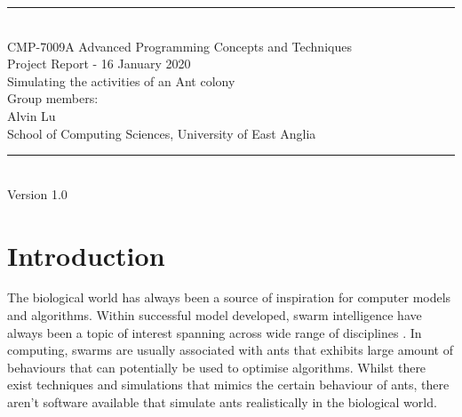 \documentclass[a4paper, oneside, 11pt]{report}
\begin{document}
\begin{titlepage}
\begin{center}
\rule{12cm}{1mm} \\
\vspace{1cm}
{\large  CMP-7009A Advanced Programming Concepts and Techniques}
\vspace{7.5cm}
\\{\Large Project Report - 16 January 2020}
\vspace{1.5cm}
\\{\LARGE Simulating the activities of an Ant colony}
\vspace{1.0cm}
\\{\Large Group members: \\ Alvin Lu}
\vspace{10.0cm}
\\{\large School of Computing Sciences, University of East Anglia}
\\ \rule{12cm}{0.5mm}
\\ \hspace{8.5cm} {\large Version 1.0}
\end{center}
\end{titlepage}


\setcounter{page}{1}


\begin{abstract}
An abstract is a brief summary (maximum 250 words) of your entire project. It should cover your objectives, your methodology used, how you implemented the methodology for your specific results and what your final results are, your final outcome or deliverable and conclusion. You do not cover literature reviews or background in an abstract nor should you use abbreviations or acronyms. In the remainder of the report the chapter titles are suggestions and can be changed (or you can add more chapters if you wish to do so). This template is designed to help you write a clear report but you are welcome to modify it (at your peril ...). Finally, a guideline in size is approximately 3,500 words (not including abstract, captions and references) but no real limit on figures, tables, etc.
\end{abstract}

\chapter{Introduction}
\label{chap:intro}

The biological world has always been a source of inspiration for computer models and algorithms. Within successful model developed, swarm intelligence have always been a topic of interest spanning across wide range of disciplines \citep{Swarm_Intro}. In computing, swarms are usually associated with ants that exhibits large amount of behaviours that can potentially be used to optimise algorithms. Whilst there exist techniques and simulations \citep{Ant_Simulator} \citep{Ant_Simulator_Revisited} \citep{Ant_Simulator_Intro}  that mimics the certain behaviour of ants, there aren't software available that simulate ants realistically in  the biological world.
\end{document}
